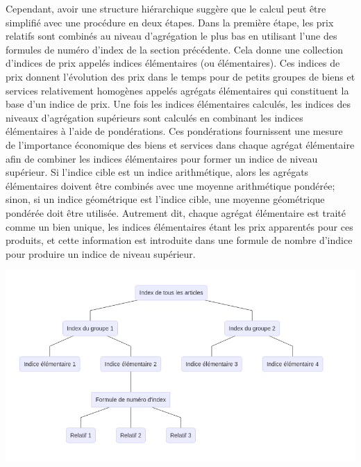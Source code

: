 \documentclass[]{article}
\begin{document}
Cependant, avoir une structure hiérarchique suggère que le calcul peut être simplifié avec une procédure en deux étapes. Dans la première étape, les prix relatifs sont combinés au niveau d'agrégation le plus bas en utilisant l'une des formules de numéro d'index de la section précédente. Cela donne une collection d'indices de prix appelés indices élémentaires (ou élémentaires). Ces indices de prix donnent l'évolution des prix dans le temps pour de petits groupes de biens et services relativement homogènes appelés agrégats élémentaires qui constituent la base d'un indice de prix. Une fois les indices élémentaires calculés, les indices des niveaux d'agrégation supérieurs sont calculés en combinant les indices élémentaires à l'aide de pondérations. Ces pondérations fournissent une mesure de l'importance économique des biens et services dans chaque agrégat élémentaire afin de combiner les indices élémentaires pour former un indice de niveau supérieur. Si l'indice cible est un indice arithmétique, alors les agrégats élémentaires doivent être combinés avec une moyenne arithmétique pondérée; sinon, si un indice géométrique est l'indice cible, une moyenne géométrique pondérée doit être utilisée. Autrement dit, chaque agrégat élémentaire est traité comme un bien unique, les indices élémentaires étant les prix apparentés pour ces produits, et cette information est introduite dans une formule de nombre d'indice pour produire un indice de niveau supérieur.

\includegraphics{img/plot2.png}
\end{document}
